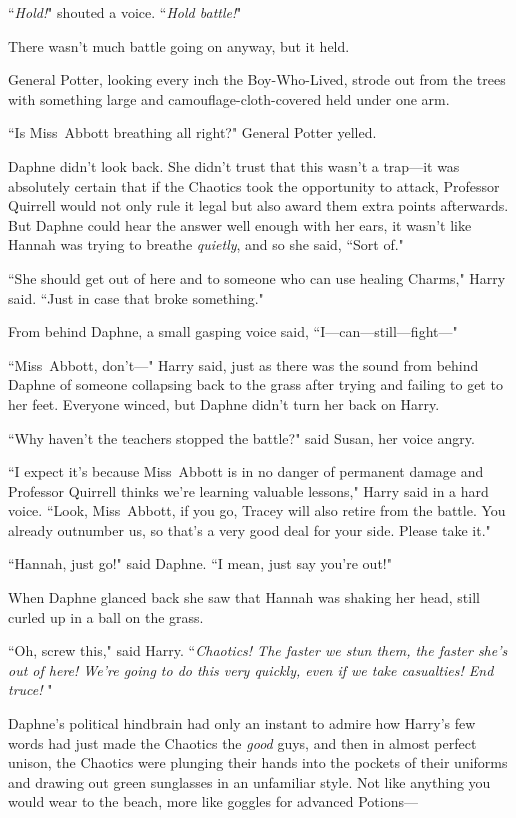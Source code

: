 ``\emph{Hold!}" shouted a voice. ``\emph{Hold battle!}"

There wasn't much battle going on anyway, but it held.

General Potter, looking every inch the Boy-Who-Lived, strode out from the trees with something large and camouflage-cloth-covered held under one arm.

``Is Miss~Abbott breathing all right?" General Potter yelled.

Daphne didn't look back. She didn't trust that this wasn't a trap—it was absolutely certain that if the Chaotics took the opportunity to attack, Professor Quirrell would not only rule it legal but also award them extra points afterwards. But Daphne could hear the answer well enough with her ears, it wasn't like Hannah was trying to breathe \emph{quietly}, and so she said, ``Sort of."

``She should get out of here and to someone who can use healing Charms," Harry said. ``Just in case that broke something."

From behind Daphne, a small gasping voice said, ``I—can—still—fight—"

``Miss~Abbott, don't—" Harry said, just as there was the sound from behind Daphne of someone collapsing back to the grass after trying and failing to get to her feet. Everyone winced, but Daphne didn't turn her back on Harry.

``Why haven't the teachers stopped the battle?" said Susan, her voice angry.

``I expect it's because Miss~Abbott is in no danger of permanent damage and Professor Quirrell thinks we're learning valuable lessons," Harry said in a hard voice. ``Look, Miss~Abbott, if you go, Tracey will also retire from the battle. You already outnumber us, so that's a very good deal for your side. Please take it."

``Hannah, just go!" said Daphne. ``I mean, just say you're out!"

When Daphne glanced back she saw that Hannah was shaking her head, still curled up in a ball on the grass.

``Oh, screw this," said Harry. ``\emph{Chaotics! The faster we stun them, the faster she's out of here! We're going to do this very quickly, even if we take casualties! End truce! }"

Daphne's political hindbrain had only an instant to admire how Harry's few words had just made the Chaotics the \emph{good} guys, and then in almost perfect unison, the Chaotics were plunging their hands into the pockets of their uniforms and drawing out green sunglasses in an unfamiliar style. Not like anything you would wear to the beach, more like goggles for advanced Potions—


